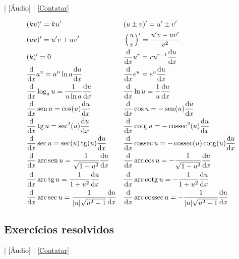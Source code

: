 \begin{flushright}
  [Vídeo] | [Áudio] | \href{https://phkonzen.github.io/notas/contato.html}{[Contatar]}
\end{flushright}

\begin{small}
\begin{align}
  & (ku)' = ku' && (u\pm v)' = u' \pm v'\\
  & (uv)' = u'v + uv' && \left(\frac{u}{v}\right)' = \frac{u'v - uv'}{v^2} \\
  & (k)' = 0 && \frac{\mathrm{d}}{\mathrm{d} x}u^r = ru^{r-1}\frac{\mathrm{d} u}{\mathrm{d} x}\\
  & \frac{\mathrm{d}}{\mathrm{d} x}a^u = a^u\ln a\frac{\mathrm{d} u}{\mathrm{d} x} && \frac{\mathrm{d}}{\mathrm{d} x}e^u = e^u\frac{\mathrm{d} u}{\mathrm{d} x} \\
  & \frac{\mathrm{d}}{\mathrm{d} x}\log_a u = \frac{1}{u\ln a}\frac{\mathrm{d} u}{\mathrm{d} x} && \frac{\mathrm{d}}{\mathrm{d} x}\ln u = \frac{1}{u}\frac{\mathrm{d} u}{\mathrm{d} x} \\
  & \frac{\mathrm{d}}{\mathrm{d} x}\operatorname{sen} u = \cos(u)\frac{\mathrm{d} u}{\mathrm{d} x} && \frac{\mathrm{d}}{\mathrm{d} x}\cos u = - \operatorname{sen}(u)\frac{\mathrm{d} u}{\mathrm{d} x}\\
  & \frac{\mathrm{d}}{\mathrm{d} x}\operatorname{tg} u = \sec^2(u)\frac{\mathrm{d} u}{\mathrm{d} x} && \frac{\mathrm{d}}{\mathrm{d} x}\operatorname{cotg} u = -\operatorname{cossec}^2(u)\frac{\mathrm{d} u}{\mathrm{d} x} \\
  & \frac{\mathrm{d}}{\mathrm{d} x}\sec u = \sec(u)\operatorname{tg}(u)\frac{\mathrm{d} u}{\mathrm{d} x} && \frac{\mathrm{d}}{\mathrm{d} x}\operatorname{cossec} u = -\operatorname{cossec}(u)\operatorname{cotg}(u)\frac{\mathrm{d} u}{\mathrm{d} x} \\
  &\frac{\mathrm{d}}{\mathrm{d} x}\operatorname{arc}\operatorname{sen} u = \frac{1}{\sqrt{1-u^2}}\frac{\mathrm{d} u}{\mathrm{d} x} && \frac{\mathrm{d}}{\mathrm{d} x}\operatorname{arc}\cos u = -\frac{1}{\sqrt{1-u^2}}\frac{\mathrm{d} u}{\mathrm{d} x} \\
  &\frac{\mathrm{d}}{\mathrm{d} x}\operatorname{arc}\operatorname{tg} u = \frac{1}{1+u^2}\frac{\mathrm{d} u}{\mathrm{d} x} && \frac{\mathrm{d}}{\mathrm{d} x}\operatorname{arc}\operatorname{cotg} u = -\frac{1}{1+u^2}\frac{\mathrm{d} u}{\mathrm{d} x} \\
  &\frac{\mathrm{d}}{\mathrm{d} x}\operatorname{arc}\sec u = \frac{1}{|u|\sqrt{u^2-1}}\frac{\mathrm{d} u}{\mathrm{d} x} && \frac{\mathrm{d}}{\mathrm{d} x}\operatorname{arc}\operatorname{cossec} u = -\frac{1}{|u|\sqrt{u^2-1}}\frac{\mathrm{d} u}{\mathrm{d} x}
\end{align}
\end{small}

\subsection*{Exercícios resolvidos}

\begin{flushright}
  [Vídeo] | [Áudio] | \href{https://phkonzen.github.io/notas/contato.html}{[Contatar]}
\end{flushright}

